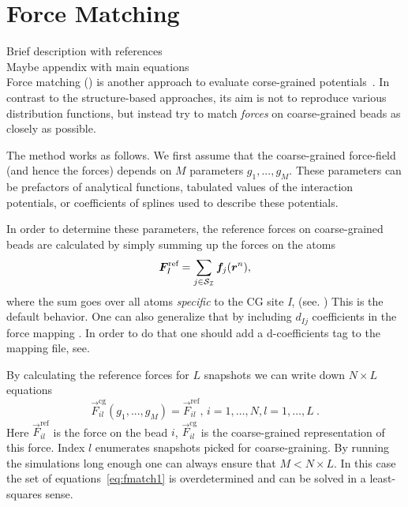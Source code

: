 \section{Force Matching}
\label{sec:fm}

\sasha

Brief description with references \\
Maybe appendix with main equations \\

Force matching (\fm) is another approach to evaluate corse-grained potentials~\cite{Ercolessi:1994,Izvekov:2005,Noid:2007}. In contrast to the structure-based approaches, its aim is not to reproduce various distribution functions, but instead try to match {\em forces} on coarse-grained beads as closely as possible.

The method works as follows. We first assume that the coarse-grained force-field (and hence the forces) depends on $M$ parameters $g_1,...,g_M $. These parameters can be prefactors of analytical functions, tabulated values of the interaction potentials, or coefficients of splines used to describe these potentials.

In order to determine these parameters, the reference forces on coarse-grained beads are calculated by simply summing up the forces on the atoms
\begin{equation}
  {\vec F}_I^\text{ref} = \sum_{j \in {\cal S_I}} {\vec f}_j({\vec r^n}),
  \label{eq:force_mapping}
\end{equation}
where the sum goes over all atoms {\it specific} to the CG site {\it I}, (see. )
This is the default behavior. One can also generalize that by including $d_{Ij}$ coefficients in the force mapping \cite{Noid:2008.1}. In order to do that one should add a d-coefficients tag to the mapping file, see. 

By calculating the reference forces for $L$ snapshots we can write down $N \times L$ equations
%
\begin{equation}
  {\vec F}_{il}^\text{cg}(g_1,...,g_M)=\vec F_{il}^\text{ref},\, i=1,\dots,N, l=1,\dots,L~.
  \label{eq:fmatch1}
\end{equation}
%
Here ${\vec F}_{il}^\text{ref}$ is the force on the bead $i$, ${\vec F}_{il}^\text{cg} $ is the coarse-grained representation of this force. Index $l$ enumerates snapshots picked for coarse-graining. By running the simulations long enough one can always ensure that $M < N \times L$. In this case the set of equations~\ref{eq:fmatch1} is overdetermined and can be solved in a least-squares sense.

